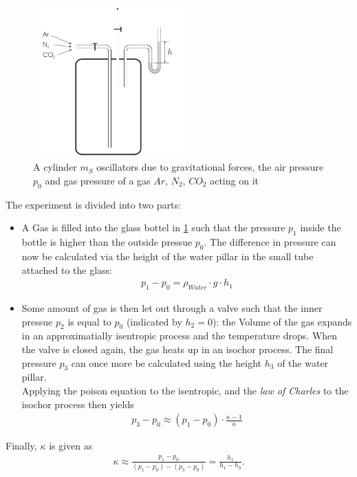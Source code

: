 \documentclass{subfiles}
\begin{document}
            \begin{figure}[H]
                \centering
                \includegraphics[width=6cm]{Bilddateien/Grundlagen/IsentropicClementDesormes.png}
                \caption{A cylinder $m_S$ oscillators due to gravitational forces, the air pressure $p_0$ and gas pressure of a gas $Ar$, $N_2$, $CO_2$ acting on it}
                \label{fig:ClementDesormes}
            \end{figure}

            The experiment is divided into two parts:
            \begin{itemize}
                \item A Gas is filled into the glass bottel in \ref{fig:ClementDesormes} such that the pressure $p_1$ inside the bottle is higher than the outside pressue $p_0$. The difference in pressure can now be calculated via the height of the water pillar in the small tube attached to the glass:
                \begin{align*}
                    p_1-p_0=\rho_{Water}\cdot g\cdot h_1
                \end{align*} 
                \item Some amount of gas is then let out through a valve such that the inner pressue $p_2$ is equal to $p_0$ (indicated by $h_2=0$): the Volume of the gas expands in an approximatially isentropic process and the temperature drops. When the valve is closed again, the gas heats up in an isochor process. The final pressure $p_3$ can once more be calculated using the height $h_3$ of the water pillar.\\
                
                \noindent Applying the poison equation to the isentropic, and the \textit{law of Charles} to the isochor process then yields
                \begin{align*}
                    p_3-p_0\approx(p_1-p_0)\cdot\frac{\kappa-1}{\kappa}
                \end{align*}
            \end{itemize}
            Finally, $\kappa$ is given as 
            \begin{align*}
                \kappa\approx\frac{p_1-p_0}{(p_1-p_0)-(p_3-p_0)}=\frac{h_1}{h_1-h_3}.
            \end{align*} 


\end{document}
